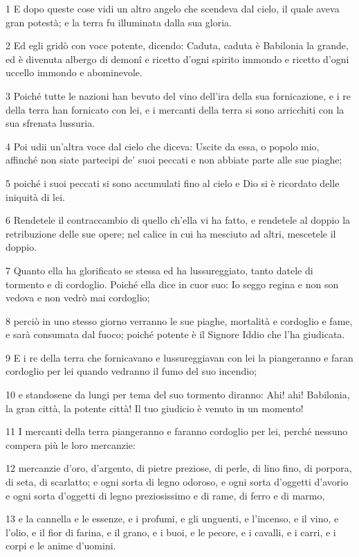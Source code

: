 \par 1 E dopo queste cose vidi un altro angelo che scendeva dal cielo, il quale aveva gran potestà; e la terra fu illuminata dalla sua gloria.
\par 2 Ed egli gridò con voce potente, dicendo: Caduta, caduta è Babilonia la grande, ed è divenuta albergo di demonî e ricetto d'ogni spirito immondo e ricetto d'ogni uccello immondo e abominevole.
\par 3 Poiché tutte le nazioni han bevuto del vino dell'ira della sua fornicazione, e i re della terra han fornicato con lei, e i mercanti della terra si sono arricchiti con la sua sfrenata lussuria.
\par 4 Poi udii un'altra voce dal cielo che diceva: Uscite da essa, o popolo mio, affinché non siate partecipi de' suoi peccati e non abbiate parte alle sue piaghe;
\par 5 poiché i suoi peccati si sono accumulati fino al cielo e Dio si è ricordato delle iniquità di lei.
\par 6 Rendetele il contraccambio di quello ch'ella vi ha fatto, e rendetele al doppio la retribuzione delle sue opere; nel calice in cui ha mesciuto ad altri, mescetele il doppio.
\par 7 Quanto ella ha glorificato se stessa ed ha lussureggiato, tanto datele di tormento e di cordoglio. Poiché ella dice in cuor suo: Io seggo regina e non son vedova e non vedrò mai cordoglio;
\par 8 perciò in uno stesso giorno verranno le sue piaghe, mortalità e cordoglio e fame, e sarà consumata dal fuoco; poiché potente è il Signore Iddio che l'ha giudicata.
\par 9 E i re della terra che fornicavano e lussureggiavan con lei la piangeranno e faran cordoglio per lei quando vedranno il fumo del suo incendio;
\par 10 e standosene da lungi per tema del suo tormento diranno: Ahi! ahi! Babilonia, la gran città, la potente città! Il tuo giudicio è venuto in un momento!
\par 11 I mercanti della terra piangeranno e faranno cordoglio per lei, perché nessuno compera più le loro mercanzie:
\par 12 mercanzie d'oro, d'argento, di pietre preziose, di perle, di lino fino, di porpora, di seta, di scarlatto; e ogni sorta di legno odoroso, e ogni sorta d'oggetti d'avorio e ogni sorta d'oggetti di legno preziosissimo e di rame, di ferro e di marmo,
\par 13 e la cannella e le essenze, e i profumi, e gli unguenti, e l'incenso, e il vino, e l'olio, e il fior di farina, e il grano, e i buoi, e le pecore, e i cavalli, e i carri, e i corpi e le anime d'uomini.
